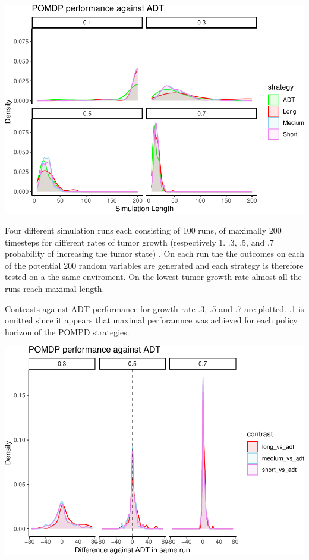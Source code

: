 \documentclass[notspecified,article,submit,moreauthors,pdftex]{Definitions/mdpi}
\begin{document}
\includegraphics{SocultPaper_files/figure-latex/unnamed-chunk-1-1.pdf}

Four different simulation runs each consisting of 100 runs, of maximally
200 timesteps for different rates of tumor growth (respectively 1. .3,
.5, and .7 probability of increasing the tumor state) . On each run the
the outcomes on each of the potential 200 random variables are generated
and each strategy is therefore tested on a the same enviroment. On the
lowest tumor growth rate almost all the runs reach maximal length.

Contrasts against ADT-performance for growth rate .3, .5 and .7 are
plotted. .1 is omitted since it appears that maximal perforamnce was
achieved for each policy horizon of the POMPD strategies.

\includegraphics{SocultPaper_files/figure-latex/unnamed-chunk-2-1.pdf}
\end{document}
